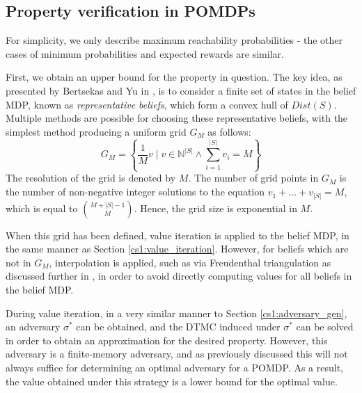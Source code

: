 \subsection{Property verification in POMDPs}
\label{cs2:properties_pomdps}

For simplicity, we only describe maximum reachability probabilities - the other cases of minimum probabilities and expected rewards are similar.

First, we obtain an upper bound for the property in question. The key idea, as presented by Bertsekas and Yu in \cite{bertsekas_approximate_2006}, is to consider a finite set of states in the belief MDP, known as \emph{representative beliefs}, which form a convex hull of $Dist(S)$. Multiple methods are possible for choosing these representative beliefs, with the simplest method producing a uniform grid $G_M$ as follows:
\begin{equation*}
    G_M = \left\{\frac{1}{M} v \mid v \in \mathbb{N}^{|S|} \wedge \mbox{$\sum_{i=1}^{|S|}$} v_i = M \right\}
\end{equation*}
The resolution of the grid is denoted by $M$. The number of grid points in $G_M$ is the number of non-negative integer solutions to the equation $v_1 + \dots + v_{|S|} = M$, which is equal to ${M + |S| - 1 \choose M}$. Hence, the grid size is exponential in $M$.

When this grid has been defined, value iteration is applied to the belief MDP, in the same manner as Section \ref{cs1:value_iteration}. However, for beliefs which are not in $G_M$, interpolation is applied, such as via Freudenthal triangulation as discussed further in \cite{lovejoy_computationally_1991}, in order to avoid directly computing values for all beliefs in the belief MDP.

During value iteration, in a very similar manner to Section \ref{cs1:adversary_gen}, an adversary $\sigma^*$ can be obtained, and the DTMC induced under $\sigma^*$ can be solved in order to obtain an approximation for the desired property. However, this adversary is a finite-memory adversary, and as previously discussed this will not always suffice for determining an optimal adversary for a POMDP. As a result, the value obtained under this strategy is a lower bound for the optimal value.

